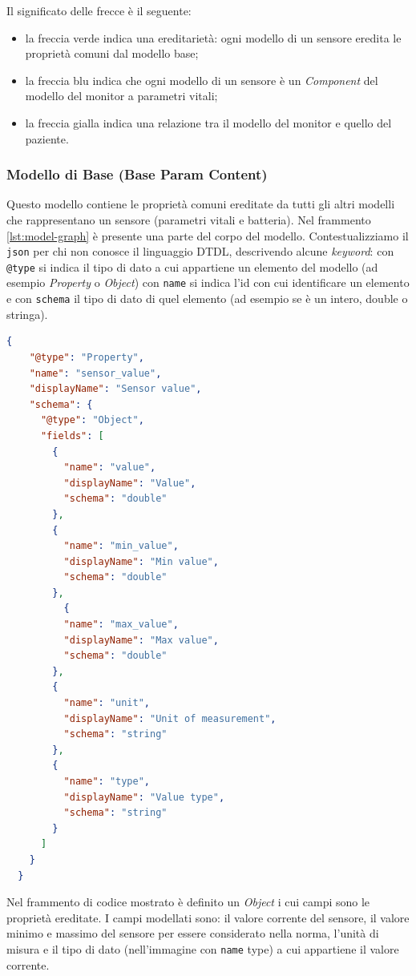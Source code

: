 Il significato delle frecce è il seguente:
\begin{itemize}
    \item la freccia verde indica una ereditarietà: ogni modello di un sensore eredita le proprietà comuni dal modello base;
    
    \item la freccia blu indica che ogni modello di un sensore è un \textit{Component} del modello del monitor a parametri vitali;
    
    \item la freccia gialla indica una relazione tra il modello del monitor e quello del paziente.
\end{itemize}

\subsubsection{Modello di Base (Base Param Content)}
Questo modello contiene le proprietà comuni ereditate da tutti gli altri modelli che rappresentano un sensore (parametri vitali e batteria). Nel frammento \ref{lst:model-graph} è presente una parte del corpo del modello. Contestualizziamo il \texttt{json} per chi non conosce il linguaggio DTDL, descrivendo alcune \textit{keyword}: con \texttt{@type} si indica il tipo di dato a cui appartiene un elemento del modello (ad esempio \textit{Property} o \textit{Object}) con \texttt{name} si indica l'id con cui identificare un elemento e con \texttt{schema} il tipo di dato di quel elemento (ad esempio se è un intero, double o stringa).
\begin{lstlisting}[label={lst:model-graph}, caption={Proprietà comuni del modello Base Param Content ereditate dai modelli.}, language=json, firstnumber=1]
 {
    "@type": "Property",
    "name": "sensor_value",
    "displayName": "Sensor value",
    "schema": {
      "@type": "Object",
      "fields": [
        {
          "name": "value",
          "displayName": "Value",
          "schema": "double"
        },
        {
          "name": "min_value",
          "displayName": "Min value",
          "schema": "double"
        },
          {
          "name": "max_value",
          "displayName": "Max value",
          "schema": "double"
        },
        {
          "name": "unit",
          "displayName": "Unit of measurement",
          "schema": "string"
        },
        {
          "name": "type",
          "displayName": "Value type",
          "schema": "string"
        }
      ]
    }
  }
\end{lstlisting}
Nel frammento di codice mostrato è definito un \textit{Object} i cui campi sono le proprietà ereditate. I campi modellati sono: il valore corrente del sensore, il valore minimo e massimo del sensore per essere considerato nella norma, l'unità di misura e il tipo di dato (nell'immagine con \texttt{name} type) a cui appartiene il valore corrente. 

